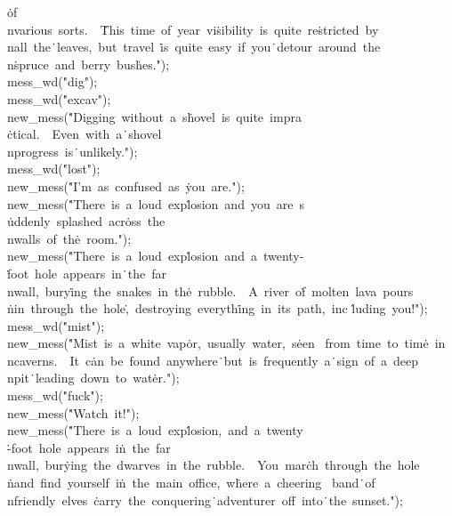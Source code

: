 \.{of\\nvarious\ sorts.\ \ }\)\.{This\ time\ of\ year\ vi}\)\.{sibility\ is\
quite\ re}\)\.{stricted\ by\\nall\ the}\)\.{\ leaves,\ but\ travel\ }\)\.{is\
quite\ easy\ if\ you}\)\.{\ detour\ around\ the\\n}\)\.{spruce\ and\ berry\
bus}\)\.{hes."});\6
\\{mess\_wd}(\.{"dig"});\5
\\{mess\_wd}(\.{"excav"});\6
\\{new\_mess}(\.{"Digging\ without\ a\ s}\)\.{hovel\ is\ quite\ impra}\)%
\.{ctical.\ \ Even\ with\ a}\)\.{\ shovel\\nprogress\ is}\)\.{\ unlikely."});\6
\\{mess\_wd}(\.{"lost"});\6
\\{new\_mess}(\.{"I'm\ as\ confused\ as\ }\)\.{you\ are."});\6
\\{new\_mess}(\.{"There\ is\ a\ loud\ exp}\)\.{losion\ and\ you\ are\ s}\)%
\.{uddenly\ splashed\ acr}\)\.{oss\ the\\nwalls\ of\ th}\)\.{e\ room."});\6
\\{new\_mess}(\.{"There\ is\ a\ loud\ exp}\)\.{losion\ and\ a\ twenty-}\)%
\.{foot\ hole\ appears\ in}\)\.{\ the\ far\\nwall,\ bury}\)\.{ing\ the\ snakes\
in\ th}\)\.{e\ rubble.\ \ A\ river\ o}\)\.{f\ molten\ lava\ pours\\}\)\.{nin\
through\ the\ hole}\)\.{,\ destroying\ everyth}\)\.{ing\ in\ its\ path,\ inc}\)%
\.{luding\ you!"});\6
\\{mess\_wd}(\.{"mist"});\6
\\{new\_mess}(\.{"Mist\ is\ a\ white\ vap}\)\.{or,\ usually\ water,\ s}\)\.{een%
\ from\ time\ to\ tim}\)\.{e\ in\\ncaverns.\ \ It\ c}\)\.{an\ be\ found\
anywhere}\)\.{\ but\ is\ frequently\ a}\)\.{\ sign\ of\ a\ deep\\npit}\)\.{\
leading\ down\ to\ wat}\)\.{er."});\6
\\{mess\_wd}(\.{"fuck"});\6
\\{new\_mess}(\.{"Watch\ it!"});\6
\\{new\_mess}(\.{"There\ is\ a\ loud\ exp}\)\.{losion,\ and\ a\ twenty}\)%
\.{-foot\ hole\ appears\ i}\)\.{n\ the\ far\\nwall,\ bur}\)\.{ying\ the\
dwarves\ in\ }\)\.{the\ rubble.\ \ You\ mar}\)\.{ch\ through\ the\ hole\\}\)%
\.{nand\ find\ yourself\ i}\)\.{n\ the\ main\ office,\ w}\)\.{here\ a\ cheering%
\ band}\)\.{\ of\\nfriendly\ elves\ }\)\.{carry\ the\ conquering}\)\.{\
adventurer\ off\ into}\)\.{\ the\ sunset."});\6
